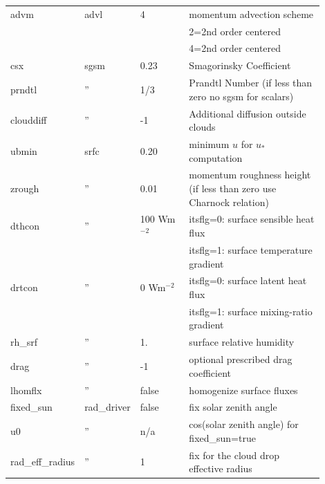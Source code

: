 \documentclass[11pt,a4paper]{article}
\begin{document}
\begin{longtable}[htb]{p{0.12\linewidth}p{0.1\linewidth}p{0.18\linewidth}p{0.5\linewidth}}
\hline
advm         & advl & 4                   & momentum advection scheme                             \\ 
             &      &                     & \hspace{2mm} 2=2nd order centered                     \\
             &      &                     & \hspace{2mm} 4=2nd order centered                     \\
\hline
csx          & sgsm & 0.23                & Smagorinsky Coefficient                               \\
prndtl       &  ''  & 1/3                 & Prandtl Number (if less than zero no sgsm for scalars) \\
clouddiff    &  ''  & -1                  & Additional diffusion outside clouds                   \\
\hline
ubmin        & srfc & 0.20                & minimum $u$ for $u_*$ computation                     \\
zrough       &  ''  & 0.01                & momentum roughness height (if less than zero use Charnock relation) \\
dthcon       &  ''  & 100 Wm$^{-2}$       & itsflg=0: surface sensible heat flux                  \\
             &      &                     & itsflg=1: surface temperature gradient                \\
drtcon       &  ''  & 0   Wm$^{-2}$       & itsflg=0: surface latent heat flux                    \\
             &      &                     & itsflg=1: surface mixing-ratio gradient               \\
rh\_srf      &  ''  & 1.                  & surface relative humidity                             \\ 
drag         &  ''  & -1                  & optional prescribed drag coefficient                  \\
lhomflx      &  ''  & false               & homogenize surface fluxes                             \\ 
\hline
fixed\_sun   &rad\_driver& false          & fix solar zenith angle                                \\
u0           &  ''  & n/a                 & cos(solar zenith angle) for fixed\_sun=true           \\
rad\_eff\_radius & '' & 1                 & fix for the cloud drop effective radius \\

\end{longtable}
\end{document}
